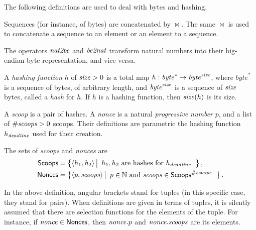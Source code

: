The following definitions are used to deal with bytes and hashing.
%
\begin{definition}
  Sequences (for instance, of bytes) are concatenated by $\bowtie$. The same $\bowtie$
  is used to concatenate a sequence to an element or an element to a sequence.
\end{definition}
%
\begin{definition}
  The operators ${\mathit{nat2be}}$ and ${\mathit{be2nat}}$ transform natural numbers
  into their big-endian byte representation, and vice versa.
\end{definition}
%
\begin{definition}
  A \emph{hashing function} $h$ of ${\mathit{size}}>0$
  is a total map $h:\mathit{byte}^*\to\mathit{byte}^{\mathit{size}}$, where
  $\mathit{byte}^*$ is a sequence of bytes, of arbitrary length,
  and $\mathit{byte}^{\mathit{size}}$ is a sequence of ${\mathit{size}}$ bytes, called a \emph{hash} for $h$.
  If $h$ is a hashing function, then ${\mathit{size}}(h)$ is its size.
\end{definition}

A \emph{scoop} is a pair of hashes.
A \emph{nonce} is a natural \emph{progressive number} $p$, and
a list of ${\#\mathit{scoops}}>0$ scoops.
Their definitions are parametric \wrt the hashing function $h_{\mathit{deadline}}$ used for their creation.
%
\begin{definition}
  The sets of \emph{scoops} and \emph{nonces} are
  \begin{align*}
    {\mathsf{Scoops}}&=\left\{\langle h_1,h_2\rangle\left|\begin{array}{l}
    h_1,h_2\text{ are hashes for }h_{\mathit{deadline}}
    \end{array}\right.\right\},\\
    {\mathsf{Nonces}}&=\left\{\langle p,{\mathit{scoops}}\rangle\left|\begin{array}{l}
    p\in\mathbb{N}\text{ and }{\mathit{scoops}}\in{\mathsf{Scoops}}^{\#\mathit{scoops}}
    \end{array}\right.\right\}.
  \end{align*}
\end{definition}
%
In the above definition, angular brackets stand for tuples (in this specific
case, they stand for pairs). When definitions are given in terms of tuples,
it is silently assumed that there are selection functions
for the elements of the tuple. For instance, if ${\mathit{nonce}}\in{\mathsf{Nonces}}$, then ${\mathit{nonce}}.p$
and ${\mathit{nonce}}.{\mathit{scoops}}$ are its elements.

